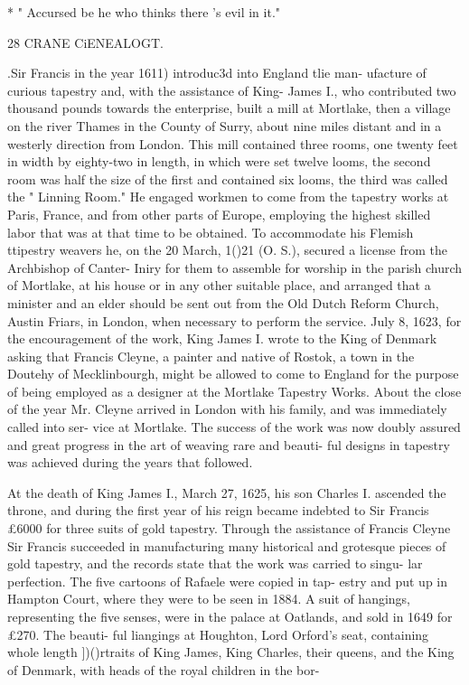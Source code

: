 * " Accursed be he who thinks there 's evil in it." 



28 CRANE CiENEALOGT. 

.Sir Francis in the year 1611) introduc3d into England tlie man- 
ufacture of curious tapestry and, with the assistance of King- 
James I., who contributed two thousand pounds towards the 
enterprise, built a mill at Mortlake, then a village on the river 
Thames in the County of Surry, about nine miles distant and in 
a westerly direction from London. This mill contained three 
rooms, one twenty feet in width by eighty-two in length, in which 
were set twelve looms, the second room was half the size of the 
first and contained six looms, the third was called the " Linning 
Room." He engaged workmen to come from the tapestry works 
at Paris, France, and from other parts of Europe, employing the 
highest skilled labor that was at that time to be obtained. To 
accommodate his Flemish ttipestry weavers he, on the 20 March, 
1()21 (O. S.), secured a license from the Archbishop of Canter- 
Iniry for them to assemble for worship in the parish church of 
Mortlake, at his house or in any other suitable place, and arranged 
that a minister and an elder should be sent out from the Old Dutch 
Reform Church, Austin Friars, in London, when necessary to 
perform the service. July 8, 1623, for the encouragement of the 
work, King James I. wrote to the King of Denmark asking that 
Francis Cleyne, a painter and native of Rostok, a town in the 
Doutehy of Mecklinbourgh, might be allowed to come to England 
for the purpose of being employed as a designer at the Mortlake 
Tapestry Works. About the close of the year Mr. Cleyne arrived 
in London with his family, and was immediately called into ser- 
vice at Mortlake. The success of the work was now doubly 
assured and great progress in the art of weaving rare and beauti- 
ful designs in tapestry was achieved during the years that followed. 

At the death of King James I., March 27, 1625, his son Charles 
I. ascended the throne, and during the first year of his reign became 
indebted to Sir Francis £6000 for three suits of gold tapestry. 
Through the assistance of Francis Cleyne Sir Francis succeeded 
in manufacturing many historical and grotesque pieces of gold 
tapestry, and the records state that the work was carried to singu- 
lar perfection. The five cartoons of Rafaele were copied in tap- 
estry and put up in Hampton Court, where they were to be seen 
in 1884. A suit of hangings, representing the five senses, were 
in the palace at Oatlands, and sold in 1649 for £270. The beauti- 
ful liangings at Houghton, Lord Orford's seat, containing whole 
length ])()rtraits of King James, King Charles, their queens, and 
the King of Denmark, with heads of the royal children in the bor- 



